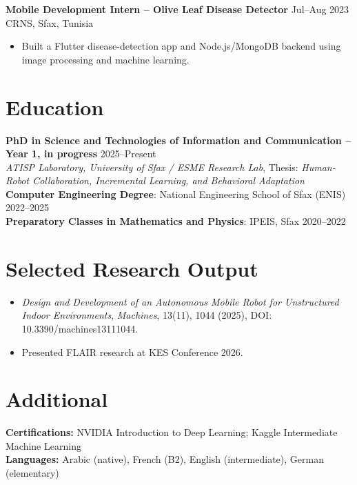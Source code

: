 \documentclass[a4paper,10pt]{article}
\begin{document}
\textbf{Mobile Development Intern -- Olive Leaf Disease Detector} \hfill Jul--Aug 2023\\
CRNS, Sfax, Tunisia
\begin{itemize}
  \item Built a Flutter disease-detection app and Node.js/MongoDB backend using image processing and machine learning.%
\end{itemize}

\section*{Education}
\textbf{PhD in Science and Technologies of Information and Communication -- Year 1, in progress} \hfill 2025--Present\\
\textit{ATISP Laboratory, University of Sfax / ESME Research Lab}, Thesis: \textit{Human-Robot Collaboration, Incremental Learning, and Behavioral Adaptation}\\
\textbf{Computer Engineering Degree}: National Engineering School of Sfax (ENIS) \hfill 2022--2025\\
\textbf{Preparatory Classes in Mathematics and Physics}: IPEIS, Sfax \hfill 2020--2022

\section*{Selected Research Output}
\begin{itemize}
  \item \textit{Design and Development of an Autonomous Mobile Robot for Unstructured Indoor Environments}, \textit{Machines}, 13(11), 1044 (2025), DOI: 10.3390/machines13111044. \quad

  \item Presented FLAIR research at KES Conference 2026.
\end{itemize}

\section*{Additional}
\textbf{Certifications:} NVIDIA Introduction to Deep Learning; Kaggle Intermediate Machine Learning\\
\textbf{Languages:} Arabic (native), French (B2), English (intermediate), German (elementary)
\end{document}
